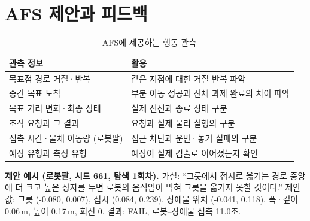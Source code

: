 \section{AFS 제안과 피드백}
\begin{table}[H]
\centering\small
\caption{AFS에 제공하는 행동 관측}
\begin{tabularx}{\linewidth}{@{}p{38mm}Y@{}}
\toprule
관측 정보 & 활용 \\
\midrule
목표점 경로 거절·반복 & 같은 지점에 대한 거절 반복 파악 \\
중간 목표 도착 & 부분 이동 성공과 전체 과제 완료의 차이 파악 \\
목표 거리 변화·최종 상태 & 실제 진전과 종료 상태 구분 \\
조작 요청과 그 결과 & 요청과 실제 물리 실행의 구분 \\
접촉 시간·물체 이동량 (로봇팔) & 접근 차단과 운반·놓기 실패의 구분 \\
예상 유형과 측정 유형 & 예상이 실제 검출로 이어졌는지 확인 \\
\bottomrule
\end{tabularx}
\end{table}

\textbf{제안 예시 (로봇팔, 시드 661, 탐색 1회차).} 가설: ``그릇에서 접시로 옮기는 경로 중앙에
더 크고 높은 상자를 두면 로봇의 움직임이 막혀 그릇을 옮기지 못할 것이다.''
제안값: 그릇 (-0.080, 0.007), 접시 (0.084, 0.239), 장애물 위치 (-0.041, 0.118), 폭·깊이 0.06\,m,
높이 0.17\,m, 회전 0. 결과: FAIL, 로봇–장애물 접촉 11.0초.
